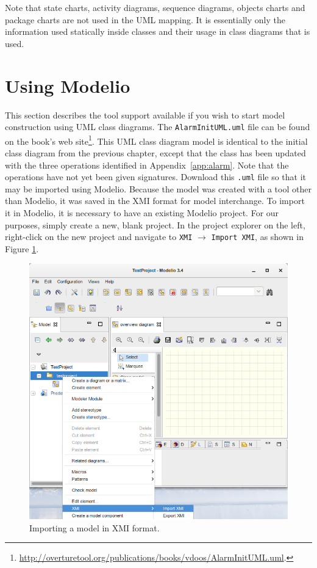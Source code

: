 
Note that state charts, activity diagrams, sequence diagrams, objects charts and package charts are not used in the UML mapping. It is essentially only the information used statically inside classes and their usage in class diagrams that is used.
%
\section{Using Modelio}\label{sec:Rose}
This section describes the tool support available if you wish to start model construction using UML class diagrams. The \texttt{AlarmInitUML.uml} file can be found on the book's web site\footnote{\url{http://overturetool.org/publications/books/vdoos/AlarmInitUML.uml}.}.
This UML class diagram model is identical to the initial class diagram from the previous chapter, except that the  class has been updated with the three operations identified in Appendix~\ref{app:alarm}.
Note that the operations have not yet been given signatures. Download this \texttt{.uml} file so that it may be imported using Modelio.  Because the model was created with a tool other than Modelio, it was saved in the XMI format for model interchange.  To import it in Modelio, it is necessary to have an existing Modelio project.  For our purposes, simply create a new, blank project.  In the project explorer on the left, right-click on the new project and navigate to \texttt{XMI} $\rightarrow$ \texttt{Import XMI}, as shown in Figure \ref{fig:importxmi}.
%
\begin{figure}[htbp]
\begin{center}
\includegraphics[width=5in]{figures/importxmi.png}
\caption{Importing a model in XMI format.}
\label{fig:importxmi}
\end{center}
\end{figure}
